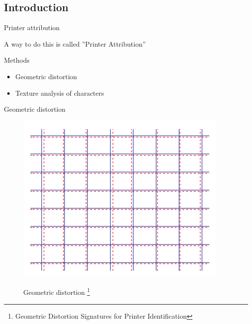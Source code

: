 \documentclass[notes]{beamer}
\begin{document}
\begin{frame}
\section{Introduction}
\begin{block}{Printer attribution}

A way to do this is called ''Printer Attribution''

\end{block}

\end{frame}

\begin{frame}

\begin{block}{Methods}

\begin{itemize}

\item Geometric distortion

\item Texture analysis of characters

\end{itemize}

\end{block}

\end{frame}

\begin{frame}

\begin{block}{Geometric distortion}

\begin{figure}[!htb]
\centering
\includegraphics[scale=0.35]{geometric_distortion}
\label{fig:geometric_distortion}
\caption{Geometric distortion \footnote{Geometric Distortion Signatures for Printer Identification\cite{Geometric_Distortion}}}
\end{figure}

\end{block}

{\let\thefootnote\relax\footnotetext{}}

\end{frame}
\end{document}
